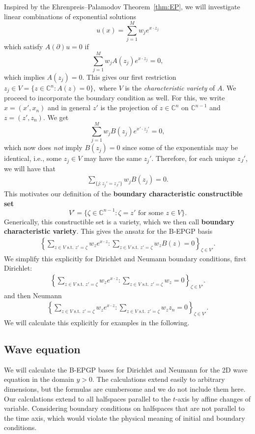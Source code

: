 \documentclass{article} %
\theoremstyle{plain}
\theoremstyle{definition}
\theoremstyle{remark}
\newcommand{\CC}{\mathbb{C}}
\begin{document}
Inspired by the Ehrenpreis--Palamodov Theorem~\ref{thm:EP}, we will investigate linear combinations of exponential solutions
$$
u(x)=\sum_{j=1}^M w_je^{x\cdot z_j}
$$
which satisfy $A(\partial) u=0$ if
$$
\sum_{j=1}^M w_jA(z_j)e^{x\cdot z_j}=0,
$$
which implies $A(z_j)=0$. This gives our first restriction
$
z_j\in V=\{z\in \CC^n\colon A(z)=0\},
$
where $V$ is the \textit{characteristic variety} of $A$. We proceed to incorporate the boundary condition as well. For this, we write $x=(x',x_n)$ and in general $z'$ is the projection of $z\in \CC^n$ on $\CC^{n-1}$ and $z=(z',z_n)$. We get
$$
\sum_{j=1}^M w_jB(z_j)e^{x'\cdot z_j'}=0,
$$
which now does \textit{not} imply $B(z_j)=0$ since some of the exponentials may be identical, i.e., some $z_j\in V$ may have the same $z_j'$. Therefore, for each unique $z_J'$, we will have that 
\begin{align*}
    \sum_{
   \{j\colon z_j'=z_J'\}
    } w_jB(z_j)=0.
\end{align*}
This motivates our definition of the \textbf{boundary characteristic constructible set}
$$
V'=\{\zeta\in \CC^{n-1}\colon \zeta=z'\text{ for some }z\in V\}.
$$
Generically, this constructible set is a variety, which we then call \textbf{boundary characteristic variety}.
This gives the ansatz for the B-EPGP basis
\begin{align*}%
    \left\{\sum_{z\in V\text{ s.t. }z'=\zeta} w_z e^{x\cdot z}\colon \sum_{z\in V\text{ s.t. }z'=\zeta}w_zB(z)=0\right\}_{\zeta\in V'}.
\end{align*}
We simplify this explicitly for Dirichlet and Neumann boundary conditions, first Dirichlet:
\begin{align}\label{eq:B-EP_dirichlet}
     \left\{\sum_{z\in V\text{ s.t. }z'=\zeta} w_z e^{x\cdot z}\colon \sum_{z\in V\text{ s.t. }z'=\zeta}w_z=0\right\}_{\zeta\in V'}.
\end{align}
and then Neumann
\begin{align}\label{eq:B-EP_neumann}
     \left\{\sum_{z\in V\text{ s.t. }z'=\zeta} w_z e^{x\cdot z}\colon \sum_{z\in V\text{ s.t. }z'=\zeta}w_zz_n=0\right\}_{\zeta\in V'}.
\end{align}
We will calculate this explicitly for examples in the following.
\subsection{Wave equation}\label{sec:B-EPGP_wave_calc}
We will calculate the B-EPGP bases for Dirichlet and Neumann for the 2D wave equation in the domain $y>0$. The calculations extend easily to arbitrary dimensions, but the formulas are cumbersome and we do not include them here. Our calculations extend to all halfspaces parallel to the $t$-axis by affine changes of variable. Considering boundary conditions on halfspaces that are not parallel to the time axis, which would violate the physical meaning of initial and boundary conditions.
\end{document}
